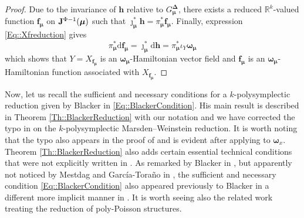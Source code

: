 \documentclass[11pt]{article}
\theoremstyle{plain}
\theoremstyle{definition}
\newcommand{\R}{\mathbb{R}}
\newcommand{\bh}{{\boldsymbol{h}}}
\renewcommand{\d}{\mathrm{d}}
\def\d{\mathrm{d}}
\numberwithin{equation}{section}
\begin{document}
\begin{proof}
    Due to the invariance of ${\boldsymbol{h}}$ relative to $G_{\boldsymbol{
    \mu}}^{\boldsymbol{\Delta}}$, there exists a reduced $\R^k$-valued function $\boldsymbol{f}_{\bm\mu}$ on ${\bf J}^{\Phi-1}(\bm\mu)$ such that $\jmath_{\bm\mu}^*{\bh}=\pi_{\bm\mu}^*{\bm f}_{\bm \mu}$.     
    Finally,  expression \eqref{Eq::Xfreduction} gives
    \begin{equation*}
\pi_{\bm\mu}^*\d\boldsymbol{f}_{\boldsymbol{\mu}}=\jmath_{\boldsymbol{\mu}}^*\d\boldsymbol{h}=\pi_{\boldsymbol{\mu}}^*\iota_{Y}\boldsymbol{\omega}_{\boldsymbol{\mu}}%
    \end{equation*}
    which shows that $Y=X_{\boldsymbol{f}_{\bm\mu}}$ is an $\bm{\omega}_{\boldsymbol{\mu}}$-Hamiltonian vector field and $\boldsymbol{f}_{\bm\mu}$ is an $\bm\omega_{\bm\mu}$-Hamiltonian function associated with $X_{\boldsymbol{f}_{\bm\mu}}$.
\end{proof}


Now, let us recall the sufficient and necessary conditions for a $k$-polysymplectic reduction given by Blacker in \eqref{Eq::BlackerCondition}. His main result is described in Theorem \ref{Th::BlackerReduction} with our notation and we have corrected the typo in \cite[Theorem 3.22]{Bla_19} on the $k$-polysymplectic Marsden--Weinstein reduction. It is worth noting that the typo also appears in the proof of \cite[Theorem 3.22]{Bla_19} and is evident after applying \cite[Theorem 2.14]{Bla_19} to ${\bm\omega}_x$. Theorem \ref{Th::BlackerReduction} also adds certain essential technical conditions that were not explicitly written in \cite[Theorem 3.22]{Bla_19}. As remarked by Blacker in \cite{Bla_09}, but apparently not noticed by Mestdag and Garc\'ia-Tora\~no in \cite{GM_23}, the sufficient and necessary condition \eqref{Eq::BlackerCondition} also appeared previously to Blacker in a different more implicit manner in \cite[pg. 12]{MRSV_15}. It is worth seeing also the related work \cite{Ni15} treating the reduction of poly-Poisson structures.
\end{document}
